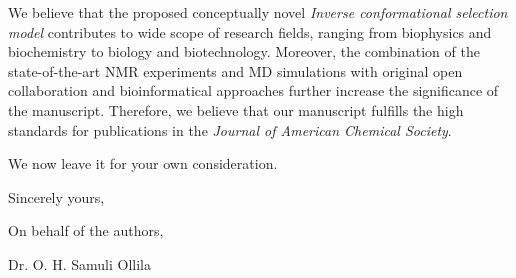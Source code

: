 \documentclass[11pt]{letter}
\begin{document}
We believe that the proposed conceptually novel {\it Inverse conformational selection model} 
contributes to wide scope of research fields, ranging from biophysics and biochemistry to biology and biotechnology.
Moreover, the combination of the state-of-the-art NMR experiments and MD simulations with original open collaboration
and bioinformatical approaches further increase the significance of the manuscript.
Therefore, we believe that our manuscript fulfills the high standards for publications in the \textit{Journal of American Chemical Society}.

We now leave it for your own consideration.

Sincerely yours,

On behalf of the authors,

Dr. O. H. Samuli Ollila
\end{document}
